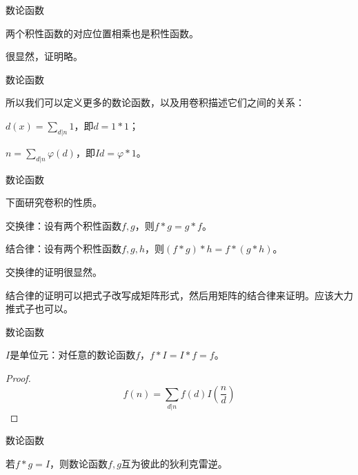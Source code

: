 \documentclass{ctexbeamer}        %
\begin{document}
\begin{frame}{数论函数}

\begin{theorem}
    两个积性函数的对应位置相乘也是积性函数。
\end{theorem}

很显然，证明略。

\end{frame}

\begin{frame}{数论函数}

所以我们可以定义更多的数论函数，以及用卷积描述它们之间的关系：
\begin{example}[数论函数]
    $d(x)=\sum_{d|n}1$，即$d=1 \ast 1$；

    $n = \sum_{d|n} \varphi(d)$，即$Id=\varphi \ast 1$。
\end{example}

\end{frame}

\begin{frame}{数论函数}

下面研究卷积的性质。
\begin{theorem}[卷积运算律]
    交换律：设有两个积性函数$f,g$，则$f \ast g = g\ast f$。

    结合律：设有两个积性函数$f,g,h$，则$(f \ast g) \ast h = f \ast (g\ast h)$。
\end{theorem}

交换律的证明很显然。

结合律的证明可以把式子改写成矩阵形式，然后用矩阵的结合律来证明。应该大力推式子也可以。

\end{frame}

\begin{frame}{数论函数}

\begin{theorem}[单位元]
    $I$是单位元：对任意的数论函数$f$，$f \ast I = I \ast f = f$。
\end{theorem}

\begin{proof}
    $$f(n)=\sum_{d|n}f(d)I(\frac{n}{d})$$
\end{proof}

\end{frame}

\begin{frame}{数论函数}

\begin{definition}[狄利克雷逆]
    若$f \ast g = I$，则数论函数$f,g$互为彼此的狄利克雷逆。
\end{definition}

\end{frame}
\end{document}
